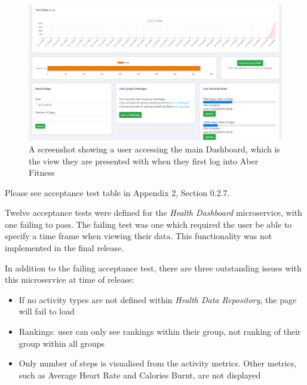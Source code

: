\begin{figure}[H]
    \centering
    \includegraphics[width=\textwidth]{Images/service_dashboard.png}
    \caption{A screenshot showing a user accessing the main Dashboard, which is the view they are presented with when they first log into Aber Fitness}
\end{figure}

Please see acceptance test table in Appendix 2, Section 0.2.7.

Twelve acceptance tests were defined for the \textit{Health Dashboard} microservice, with one failing to pass. The failing test was one which required the user be able to specify a time frame when viewing their data. This functionality was not implemented in the final release.

In addition to the failing acceptance test, there are three outstanding issues with this microservice at time of release:

\begin{itemize}

	\item If no activity types are not defined within \textit{Health Data Repository}, the page will fail to load

	\item Rankings: user can only see rankings within their group, not ranking of their group within all groups
	
	\item Only number of steps is visualised from the activity metrics. Other metrics, such as Average Heart Rate and Calories Burnt, are not displayed

\end{itemize}